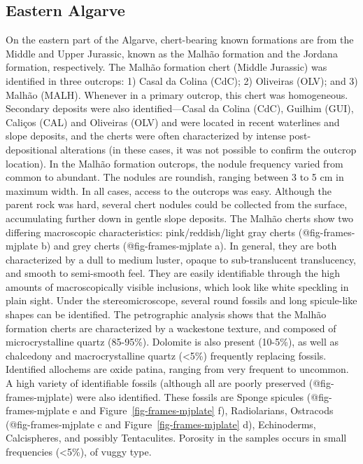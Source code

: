\documentclass[
  a4paper,
  DIV=11,
  numbers=noendperiod]{scrreprt}
\begin{document}
\subsection{Eastern Algarve}\label{eastern-algarve}

On the eastern part of the Algarve, chert-bearing known formations are
from the Middle and Upper Jurassic, known as the Malhão formation and
the Jordana formation, respectively. The Malhão formation chert (Middle
Jurassic) was identified in three outcrops: 1) Casal da Colina (CdC); 2)
Oliveiras (OLV); and 3) Malhão (MALH). Whenever in a primary outcrop,
this chert was homogeneous. Secondary deposits were also
identified---Casal da Colina (CdC), Guilhim (GUI), Caliços (CAL) and
Oliveiras (OLV) and were located in recent waterlines and slope
deposits, and the cherts were often characterized by intense
post-depositional alterations (in these cases, it was not possible to
confirm the outcrop location). In the Malhão formation outcrops, the
nodule frequency varied from common to abundant. The nodules are
roundish, ranging between 3 to 5 cm in maximum width. In all cases,
access to the outcrops was easy. Although the parent rock was hard,
several chert nodules could be collected from the surface, accumulating
further down in gentle slope deposits. The Malhão cherts show two
differing macroscopic characteristics: pink/reddish/light gray cherts
(@fig-frames-mjplate b) and grey cherts (@fig-frames-mjplate a). In
general, they are both characterized by a dull to medium luster, opaque
to sub-translucent translucency, and smooth to semi-smooth feel. They
are easily identifiable through the high amounts of macroscopically
visible inclusions, which look like white speckling in plain sight.
Under the stereomicroscope, several round fossils and long spicule-like
shapes can be identified. The petrographic analysis shows that the
Malhão formation cherts are characterized by a wackestone texture, and
composed of microcrystalline quartz (85-95\%). Dolomite is also present
(10-5\%), as well as chalcedony and macrocrystalline quartz
(\textless5\%) frequently replacing fossils. Identified allochems are
oxide patina, ranging from very frequent to uncommon. A high variety of
identifiable fossils (although all are poorly preserved
(@fig-frames-mjplate) were also identified. These fossils are Sponge
spicules (@fig-frames-mjplate e and Figure~\ref{fig-frames-mjplate} f),
Radiolarians, Ostracods (@fig-frames-mjplate c and
Figure~\ref{fig-frames-mjplate} d), Echinoderms, Calcispheres, and
possibly Tentaculites. Porosity in the samples occurs in small
frequencies (\textless5\%), of vuggy type.
\end{document}
